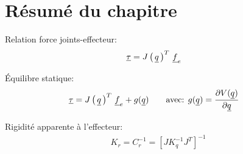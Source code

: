 

\newpage
\section{Résumé du chapitre}


Relation force joints-effecteur:
\begin{align}
\underline{\tau} &= J\left( \, \underline{q} \, \right)^T \, \underline{f}_e 
\end{align}

Équilibre statique:
\begin{align}
\underline{\tau} &= J\left( \, \underline{q} \, \right)^T \, \underline{f}_e +  g( \underline{q} )
\quad \quad \text{avec:  }
g( \underline{q} ) = 
\frac{ \partial V(\underline{q} ) }{\partial \underline{q} } 
\end{align}

Rigidité apparente à l'effecteur:
\begin{align}
K_r = C_r^{-1} = \left[ J K_q^{-1} J^T \right]^{-1}
\end{align}

